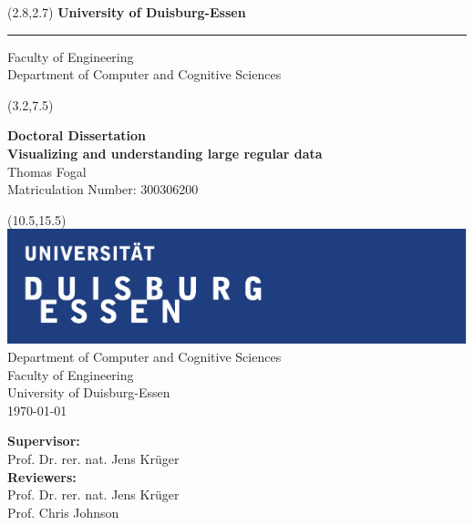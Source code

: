 \begin{titlepage}
\vspace*{-1cm}
\newlength{\links}
\setlength{\links}{0.9cm}
\setlength{\TPHorizModule}{1cm}
\setlength{\TPVertModule}{1cm}

\sf
\LARGE

\begin{textblock}{16.5}(2.8,2.7)
 \hspace*{-0.8cm} \textbf{University of Duisburg-Essen} \\
 \hspace*{-1.15cm} \rule{5mm}{5mm} \hspace*{0.0cm} Faculty of Engineering\\
 \large{}Department of Computer and Cognitive Sciences\\
\end{textblock}

\begin{textblock}{14.5}(3.2,7.5)
\begin{center}
  \large
{\bf Doctoral Dissertation} \\[1cm]
{ \LARGE  \bf Visualizing and understanding large regular data} \\[1.3cm]
Thomas Fogal\\
Matriculation Number: 300306200
\end{center}
\end{textblock}

\begin{textblock}{10}(10.5,15.5)
\includegraphics[width=.94\textwidth]{images/unilogo}\\
\normalsize
\raggedleft
Department of Computer and Cognitive Sciences \\
Faculty of Engineering \\
University of Duisburg-Essen \\[2ex]

\today\\[13ex]
\raggedright
{\bf Supervisor:} \\
Prof. Dr. rer. nat. Jens Kr\"uger\\

{\bf Reviewers:}\\
Prof. Dr. rer. nat. Jens Kr\"uger\\
Prof. Chris Johnson\\
\end{textblock}

\end{titlepage}

